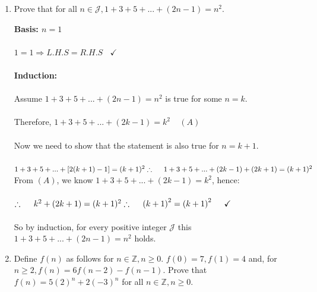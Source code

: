 \documentclass[fleqn]{article}
\begin{document}
\begin{enumerate}
    \item Prove that for all $n \in \mathcal{J}, 1+3+5+...+(2n-1)=n^2$.
    
      \textcolor{hwColor}{
        \textbf{Basis: $n=1$}
        \\
        \\
        $
          1=1 \Longrightarrow L.H.S=R.H.S ~~~~ \checkmark 
        $
        \\
        \\
        \textbf{Induction:}
        \\
        \\
        Assume $1+3+5+...+(2n-1)=n^2$ is true for some $n=k$. 
        \\
        \\
        Therefore, $1+3+5+...+(2k-1)=k^2 ~~~~~ (A)$
        \\
        \\
        Now we need to show that the statement is also true for $n=k+1$.
        \\
        \\
        $
          1+3+5+...+ \left[2(k+1)-1\right]=(k+1)^2
          \\
          \\
          \\
          \therefore ~~~~ 1+3+5+...+\left(2k-1\right)+\left(2k+1\right)=(k+1)^2
          \\
          \\
          \\
        $
        From $(A)$, we know $1+3+5+...+(2k-1)=k^2$, hence:
        \\
        \\
        $
          \therefore ~~~~ k^2+\left(2k+1\right)=(k+1)^2
          \\
          \\
          \\
          \therefore ~~~~ \left(k+1\right)^2=\left(k+1\right)^2 ~~~~ \checkmark
        $
        \\
        \\
        So by induction, for every positive integer $\mathcal{J}$ this $1+3+5+...+(2n-1)=n^2$ holds.
      }

    \item Define $f(n)$ as follows for $n \in \mathbb{Z}, n\geqslant 0$. $f(0)=7, f(1)=4$
    and, for $n \geqslant 2, f(n)=6f(n-2)-f(n-1)$. Prove that $f(n)=5(2)^n+2(-3)^n$ for 
    all $n \in \mathbb{Z}, n \geqslant 0$.


\end{enumerate}
\end{document}

